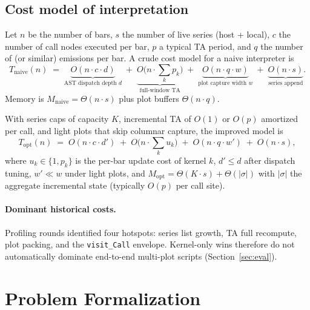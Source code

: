 \documentclass[11pt,a4paper]{article}
\begin{document}
\subsection{Cost model of interpretation}
\label{sec:bg-cost}

Let $n$ be the number of bars, $s$ the number of live series (host + local),
$c$ the number of call nodes executed per bar, $p$ a typical TA period, and
$q$ the number of  (or similar) emissions per bar.  A crude cost
model for a naive interpreter is
\begin{equation}
\label{eq:cost-naive}
  T_{\mathrm{naive}}(n)
  \;=\;
  \underbrace{O(n\cdot c\cdot d)}_{\text{AST dispatch depth }d}
  \;+\;
  \underbrace{O\!\big(n\cdot \textstyle\sum_k p_k\big)}_{\text{full-window TA}}
  \;+\;
  \underbrace{O(n\cdot q\cdot w)}_{\text{plot capture width }w}
  \;+\;
  \underbrace{O(n\cdot s)}_{\text{series append}}.
\end{equation}
Memory is $M_{\mathrm{naive}}=\Theta(n\cdot s)$ plus plot buffers
$\Theta(n\cdot q)$.

With series caps of capacity $K$, incremental TA of $O(1)$ or $O(p)$ amortized
per call, and light plots that skip columnar capture, the improved model is
\begin{equation}
\label{eq:cost-opt}
  T_{\mathrm{opt}}(n)
  \;=\;
  O(n\cdot c\cdot d')
  \;+\;
  O\!\big(n\cdot \textstyle\sum_k u_k\big)
  \;+\;
  O(n\cdot q\cdot w')
  \;+\;
  O(n\cdot s),
\end{equation}
where $u_k\in\{1,p_k\}$ is the per-bar update cost of kernel $k$, $d'\le d$
after dispatch tuning, $w'\ll w$ under light plots, and
$M_{\mathrm{opt}}=\Theta(K\cdot s)+\Theta(|\sigma|)$ with $|\sigma|$ the
aggregate incremental state (typically $O(p)$ per call site).

\paragraph{Dominant historical costs.}
Profiling rounds identified four hotspots: series list growth, TA full
recompute, plot packing, and the \texttt{visit\_Call} envelope.  Kernel-only
wins therefore do not automatically dominate end-to-end multi-plot scripts
(Section~\ref{sec:eval}).

\section{Problem Formalization}
\label{sec:problem}
\end{document}
